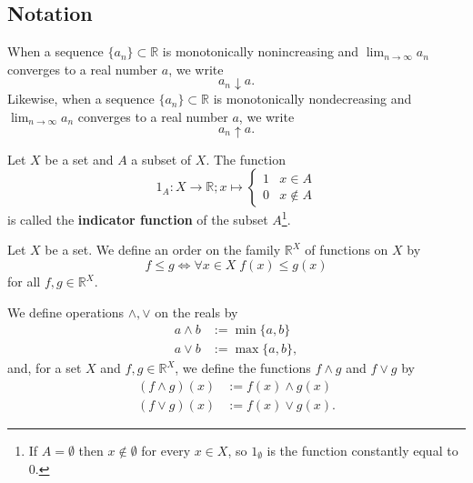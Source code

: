 \subsection{Notation}

\begin{definition}
  When a sequence $\{a_n\}\subset\mathbb{R}$ is monotonically nonincreasing and
  $\lim_{n\to\infty}a_n$ converges to a real number $a$, we write
  \[
    a_n\downarrow a .
  \]
  Likewise, when a sequence $\{a_n\}\subset\mathbb{R}$ is monotonically
  nondecreasing and $\lim_{n\to\infty}a_n$ converges to a real number $a$, we write
  \[
    a_n\uparrow a .
  \]
\end{definition}

\begin{definition}
  Let $X$ be a set and $A$ a subset of $X$.
  The function
  \[
    1_A:X \to\mathbb{R};x\mapsto\begin{cases} 1 & x\in A \\ 0 & x\notin A \end{cases}
  \]
  is called the \textbf{indicator function} of the subset $A$\footnote{
    If $A=\emptyset$ then $x\notin\emptyset$ for every $x\in X$, so
    $1_\emptyset$ is the function constantly equal to $0$.
  }.
\end{definition}

\begin{definition}
  Let $X$ be a set.
  We define an order on the family $\mathbb{R}^X$ of functions on $X$ by
  \[
    f\le g \iff \forall x\in X  \; f(x)\le g(x)
  \]
  for all $f,g\in\mathbb{R}^X$.
\end{definition}

\begin{definition}
  We define operations $\land, \lor$ on the reals by
  \begin{align*}
    a\land b&:=\min\{a,b\}\\
    a\lor b&:=\max\{a,b\} ,
  \end{align*}
  and, for a set $X$ and $f,g\in\mathbb{R}^X$, we define the functions
  $f\land g$ and $f\lor g$ by
  \begin{align*}
    (f\land g)(x)&:=f(x)\land g(x) \\
    (f\lor g)(x)&:=f(x)\lor g(x) .
  \end{align*}
\end{definition}
